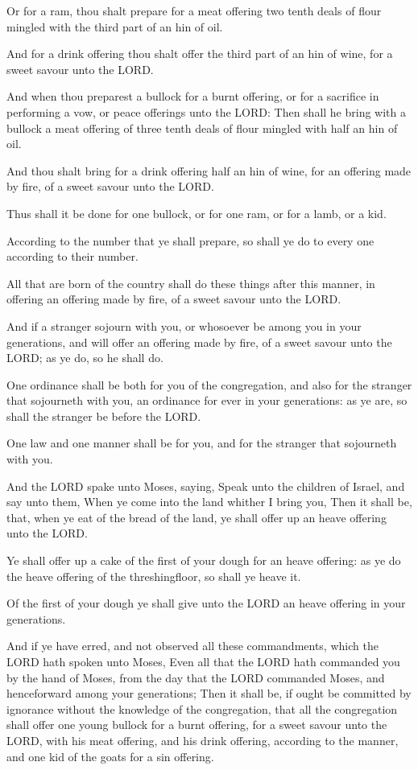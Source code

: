 \verse Or for a ram, thou shalt prepare for a meat offering two tenth
deals of flour mingled with the third part of an hin of oil.

\verse And for a drink offering thou shalt offer the third part of an
hin of wine, for a sweet savour unto the LORD.

\verse And when thou preparest a bullock for a burnt offering, or for a
sacrifice in performing a vow, or peace offerings unto the LORD: \verse
Then shall he bring with a bullock a meat offering of three tenth
deals of flour mingled with half an hin of oil.

\verse And thou shalt bring for a drink offering half an hin of wine,
for an offering made by fire, of a sweet savour unto the LORD.

\verse Thus shall it be done for one bullock, or for one ram, or for a
lamb, or a kid.

\verse According to the number that ye shall prepare, so shall ye do to
every one according to their number.

\verse All that are born of the country shall do these things after
this manner, in offering an offering made by fire, of a sweet savour
unto the LORD.

\verse And if a stranger sojourn with you, or whosoever be among you in
your generations, and will offer an offering made by fire, of a sweet
savour unto the LORD; as ye do, so he shall do.

\verse One ordinance shall be both for you of the congregation, and
also for the stranger that sojourneth with you, an ordinance for ever
in your generations: as ye are, so shall the stranger be before the
LORD.

\verse One law and one manner shall be for you, and for the stranger
that sojourneth with you.

\verse And the LORD spake unto Moses, saying, \verse Speak unto the
children of Israel, and say unto them, When ye come into the land
whither I bring you, \verse Then it shall be, that, when ye eat of the
bread of the land, ye shall offer up an heave offering unto the LORD.

\verse Ye shall offer up a cake of the first of your dough for an heave
offering: as ye do the heave offering of the threshingfloor, so shall
ye heave it.

\verse Of the first of your dough ye shall give unto the LORD an heave
offering in your generations.

\verse And if ye have erred, and not observed all these commandments,
which the LORD hath spoken unto Moses, \verse Even all that the LORD
hath commanded you by the hand of Moses, from the day that the LORD
commanded Moses, and henceforward among your generations; \verse Then
it shall be, if ought be committed by ignorance without the knowledge
of the congregation, that all the congregation shall offer one young
bullock for a burnt offering, for a sweet savour unto the LORD, with
his meat offering, and his drink offering, according to the manner,
and one kid of the goats for a sin offering.

